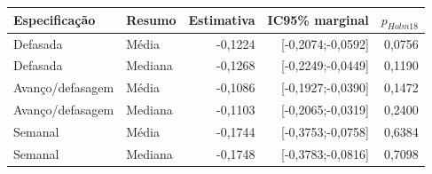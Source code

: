 \begin{tabular}{llrrr}
\toprule
Especificação & Resumo & Estimativa & IC95\% marginal & $p_{Holm18}$\\
\midrule
Defasada & Média & -0,1224 & [-0,2074;-0,0592] & 0,0756\\
Defasada & Mediana & -0,1268 & [-0,2249;-0,0449] & 0,1190\\
Avanço/defasagem & Média & -0,1086 & [-0,1927;-0,0390] & 0,1472\\
Avanço/defasagem & Mediana & -0,1103 & [-0,2065;-0,0319] & 0,2400\\
Semanal & Média & -0,1744 & [-0,3753;-0,0758] & 0,6384\\
Semanal & Mediana & -0,1748 & [-0,3783;-0,0816] & 0,7098\\
\bottomrule
\end{tabular}
